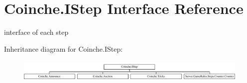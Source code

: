 \hypertarget{interface_coinche_1_1_i_step}{}\section{Coinche.\+I\+Step Interface Reference}
\label{interface_coinche_1_1_i_step}


interface of each step  


Inheritance diagram for Coinche.\+I\+Step\+:\begin{figure}[H]
\begin{center}
\leavevmode
\includegraphics[height=1.081081cm]{interface_coinche_1_1_i_step}
\end{center}
\end{figure}
